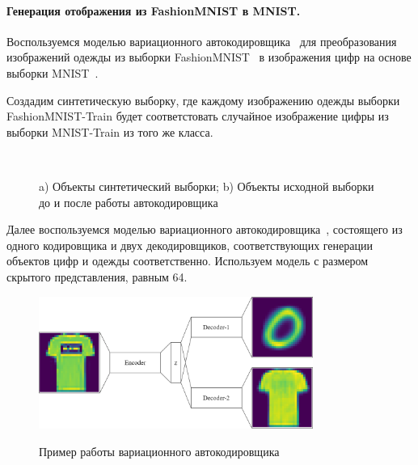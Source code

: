 \newpage
\paragraph{Генерация отображения из FashionMNIST в MNIST.}
Воспользуемся моделью вариационного автокодировщика~\cite{VAE} для преобразования изображений одежды из выборки FashionMNIST~\cite{FMNIST} в изображения цифр на основе выборки MNIST~\cite{MNIST}.

Создадим синтетическую выборку, где каждому изображению одежды выборки FashionMNIST-Train будет соответстовать случайное изображение цифры из выборки MNIST-Train из того же класса.

\begin{figure}[h!t]\center
{}
\qquad
{}\\
\caption{a) Объекты синтетический выборки; b) Объекты исходной выборки до и после работы автокодировщика}
\end{figure}
Далее воспользуемся моделью вариационного автокодировщика~\cite{VAE}, состоящего из одного кодировщика и двух декодировщиков, соответствующих генерации объектов цифр и одежды соответственно. Используем модель с размером скрытого представления, равным 64.

\begin{figure}[h!t]\center
{\includegraphics[width=0.8\textwidth]{results/VAE.png}}
\caption{Пример работы вариационного автокодировщика}
\end{figure}

